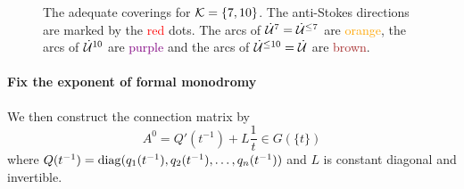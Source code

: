 \begin{figure}
  \caption{The adequate coverings for $\mathcal{K}=\{7,10\}$.
    The anti-Stokes directions are marked by the \textcolor{red}{red} dots.
    The arcs of $\dot{\mathcal{U}}^{7}=\dot{\mathcal{U}}^{\leq7}$ are
    \textcolor{orange}{orange}, the arcs of $\dot{\mathcal{U}}^{10}$ are
    \textcolor{purple}{purple} and the arcs of $\dot{\mathcal{U}}^{\leq10}=\dot{\mathcal{U}}$
    are \textcolor{brown}{brown}.
  }\label{fig:adequateCovering}
\end{figure}%

\paragraph{Fix the exponent of formal monodromy}
We then construct the connection matrix by
  \[
    A^0=Q'(t^{-1})+L\frac{1}{t} \in G(\!\{t\}\!)
  \]
where $Q(t^{-1})=\operatorname{diag}(q_1(t^{-1}),q_2(t^{-1}),\dots,q_n(t^{-1}))$ and $L$ is
constant diagonal and invertible.

